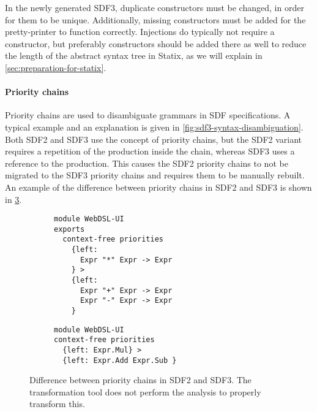       In the newly generated SDF3, duplicate constructors must be changed, in order for them to be unique. Additionally, missing constructors must be added for the pretty-printer to function correctly. Injections do typically not require a constructor, but preferably constructors should be added there as well to reduce the length of the abstract syntax tree in Statix, as we will explain in \cref{sec:preparation-for-statix}.

      \paragraph{Priority chains} Priority chains are used to disambiguate grammars in SDF specifications. A typical example and an explanation is given in \cref{fig:sdf3-syntax-disambiguation}. Both SDF2 and SDF3 use the concept of priority chains, but the SDF2 variant requires a repetition of the production inside the chain, whereas SDF3 uses a reference to the production. This causes the SDF2 priority chains to not be migrated to the SDF3 priority chains and requires them to be manually rebuilt. An example of the difference between priority chains in SDF2 and SDF3 is shown in \cref{fig:sdf2-sdf3-asc-priority-chains}.

      \begin{figure}
        \begin{subfigure}[b]{0.5\textwidth}
          \begin{verbatim}
module WebDSL-UI
exports
  context-free priorities
    {left:
      Expr "*" Expr -> Expr
    } >
    {left:
      Expr "+" Expr -> Expr
      Expr "-" Expr -> Expr
    }
          \end{verbatim}
          \caption{\label{fig:sdf2-sdf3-asc-priority-chains-sdf2}}
        \end{subfigure}
        \begin{subfigure}[b]{0.5\textwidth}
          \begin{verbatim}
module WebDSL-UI
context-free priorities
  {left: Expr.Mul} >
  {left: Expr.Add Expr.Sub }
          \end{verbatim}
          \caption{\label{fig:sdf2-sdf3-asc-priority-chains-sdf3}}
        \end{subfigure}
        \caption{\label{fig:sdf2-sdf3-asc-priority-chains}Difference between priority chains in SDF2 and SDF3. The transformation tool does not perform the analysis to properly transform this.}
      \end{figure}

